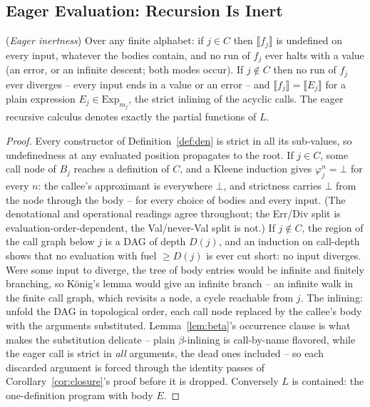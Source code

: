 \documentclass[runningheads,envcountsect]{llncs}
\begin{document}
\subsection{Eager Evaluation: Recursion Is Inert}

\begin{theorem}
    (\emph{Eager inertness})
    \label{thm:eager}
    Over any finite alphabet: if $j \in C$ then $\llbracket f_j \rrbracket$ is undefined on every input, whatever the bodies contain, and no run of $f_j$ ever halts with a value (an error, or an infinite descent; both modes occur). If $j \notin C$ then no run of $f_j$ ever diverges -- every input ends in a value or an error -- and $\llbracket f_j \rrbracket = \llbracket E_j \rrbracket$ for a plain expression $E_j \in \mathrm{Exp}_{m_j}$, the strict inlining of the acyclic calls. The eager recursive calculus denotes exactly the partial functions of $L$.
\end{theorem}

\begin{proof}
    Every constructor of Definition~\ref{def:den} is strict in all its sub-values, so undefinedness at any evaluated position propagates to the root. If $j \in C$, some call node of $B_j$ reaches a definition of $C$, and a Kleene induction gives $\varphi^n_j = \bot$ for every $n$: the callee's approximant is everywhere $\bot$, and strictness carries $\bot$ from the node through the body -- for every choice of bodies and every input. (The denotational and operational readings agree throughout; the Err/Div split is evaluation-order-dependent, the Val/never-Val split is not.) If $j \notin C$, the region of the call graph below $j$ is a DAG of depth $D(j)$, and an induction on call-depth shows that no evaluation with fuel $\geq D(j)$ is ever cut short: no input diverges. Were some input to diverge, the tree of body entries would be infinite and finitely branching, so K\"onig's lemma would give an infinite branch -- an infinite walk in the finite call graph, which revisits a node, a cycle reachable from $j$. The inlining: unfold the DAG in topological order, each call node replaced by the callee's body with the arguments substituted. Lemma~\ref{lem:beta}'s occurrence clause is what makes the substitution delicate -- plain $\beta$-inlining is call-by-name flavored, while the eager call is strict in \emph{all} arguments, the dead ones included -- so each discarded argument is forced through the identity passes of Corollary~\ref{cor:closure}'s proof before it is dropped. Conversely $L$ is contained: the one-definition program with body $E$.
\end{proof}
\end{document}
